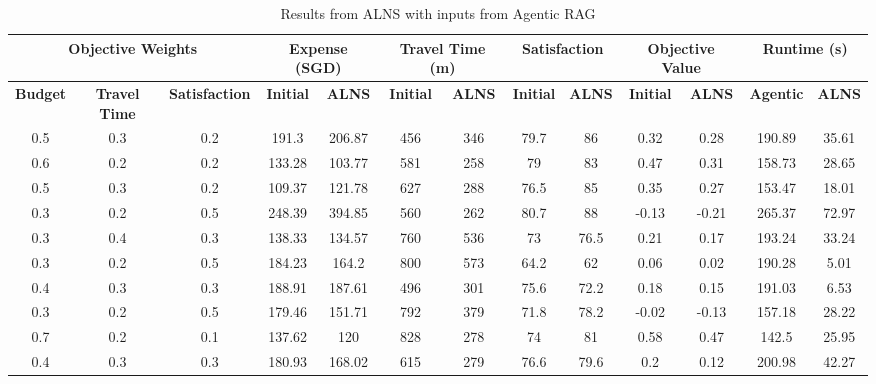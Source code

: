\documentclass{ecai}
\begin{document}
\begin{table}[htbp]
    \centering
    \begin{adjustbox}{width=0.48\textwidth}
    \begin{tabular}{|c|c|c|c|c|c|c|c|c|c|c|c|c|}
         \hline
         \multicolumn{3}{|c|}{\textbf{Objective Weights}} & \multicolumn{2}{c|}{\textbf{Expense (SGD)}} & \multicolumn{2}{c|}{\textbf{Travel Time (m)}} & \multicolumn{2}{c|}{\textbf{Satisfaction}} & \multicolumn{2}{c|}{\textbf{Objective Value}} & \multicolumn{2}{c|}{\textbf{Runtime (s)}} \\
         \hline
         \textbf{Budget} & \textbf{Travel Time} & \textbf{Satisfaction} & \textbf{Initial} & \textbf{ALNS} & \textbf{Initial} & \textbf{ALNS} & \textbf{Initial} & \textbf{ALNS} & \textbf{Initial} & \textbf{ALNS} & \textbf{Agentic} & \textbf{ALNS} \\
         \hline
         0.5 & 0.3 & 0.2 & 191.3 & 206.87 & 456 & 346 & 79.7 & 86 & 0.32 & 0.28 & 190.89 & 35.61 \\
         0.6 & 0.2 & 0.2 & 133.28 & 103.77 & 581 & 258 & 79 & 83 & 0.47 & 0.31 & 158.73 & 28.65 \\
         0.5 & 0.3 & 0.2 & 109.37 & 121.78 & 627 & 288 & 76.5 & 85 & 0.35 & 0.27 & 153.47 & 18.01 \\
         0.3 & 0.2 & 0.5 & 248.39 & 394.85 & 560 & 262 & 80.7 & 88 & -0.13 & -0.21 & 265.37 & 72.97 \\
         0.3 & 0.4 & 0.3 & 138.33 & 134.57 & 760 & 536 & 73 & 76.5 & 0.21 & 0.17 & 193.24 & 33.24 \\
         0.3 & 0.2 & 0.5 & 184.23 & 164.2 & 800 & 573 & 64.2 & 62 & 0.06 & 0.02 & 190.28 & 5.01 \\
         0.4 & 0.3 & 0.3 & 188.91 & 187.61 & 496 & 301 & 75.6 & 72.2 & 0.18 & 0.15 & 191.03 & 6.53 \\
         0.3 & 0.2 & 0.5 & 179.46 & 151.71 & 792 & 379 & 71.8 & 78.2 & -0.02 & -0.13 & 157.18 & 28.22 \\
         0.7 & 0.2 & 0.1 & 137.62 & 120 & 828 & 278 & 74 & 81 & 0.58 & 0.47 & 142.5 & 25.95 \\
         0.4 & 0.3 & 0.3 & 180.93 & 168.02 & 615 & 279 & 76.6 & 79.6 & 0.2 & 0.12 & 200.98 & 42.27 \\
         \hline
    \end{tabular}
    \end{adjustbox}
    \caption{Results from ALNS with inputs from Agentic RAG}
    \label{tab:my_label}
    \captionsetup{skip=2pt}
\end{table}
\vspace{-0.3cm}
\end{document}
